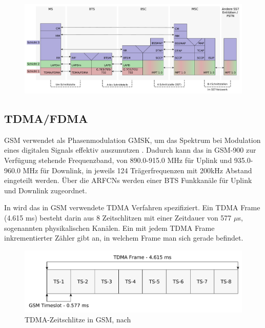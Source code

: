 \begin{figure}[H]
  \begin{center}
    \includegraphics[width=1.0\textwidth]{figures/gsm_protocol_stack.pdf}
  \end{center}
\end{figure}

\subsection{TDMA/FDMA} \label{hdl:a_tdma_fdma}

\ac{GSM} verwendet als Phasenmodulation \ac{GMSK}, um das Spektrum bei Modulation eines digitalen Signals effektiv auszunutzen . Dadurch kann das in \ac{GSM}-900 zur Verfügung stehende Frequenzband, von 890.0-915.0 MHz für Uplink und 935.0-960.0 MHz für Downlink, in jeweils 124 Trägerfrequenzen mit 200kHz Abstand eingeteilt werden. Über die \acp{ARFCN} werden einer \ac{BTS} Funkkanäle für Uplink und Downlink zugeordnet. \citep{schnabel2003kommunikationstechnik}

In  wird das in \ac{GSM} verwendete \ac{TDMA} Verfahren spezifiziert. Ein \ac{TDMA} Frame (4.615 ms) besteht darin aus 8 Zeitschlitzen mit einer Zeitdauer von 577 $\mu$s, sogenannten physikalischen Kanälen. Ein mit jedem \ac{TDMA} Frame inkrementierter Zähler gibt an, in welchem Frame man sich gerade befindet.

\begin{figure}[H]
  \begin{center}
    \includegraphics[width=1.0\textwidth]{figures/gsm_timeslots.pdf}
  \end{center}
  \caption[TDMA-Zeitschlitze in GSM]{\ac{TDMA}-Zeitschlitze in \ac{GSM}, nach } \label{fig:gsm-timeslots} 
\end{figure}

